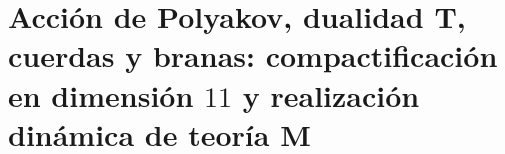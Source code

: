 \chapter{Acción de Polyakov, dualidad T, cuerdas y branas: compactificación en dimensión \texorpdfstring{\(11\)}{11} y realización dinámica de teoría M}
\label{chap:md-teoria-m-definitiva}
\begingroup
\let\HMTOwnerSection\section
\let\HMTOwnerSubsection\subsection
\let\HMTOwnerSubsubsection\subsubsection
\let\HMTOwnerParagraph\paragraph
\let\chapter\HMTOwnerSection
\let\section\HMTOwnerSubsection
\let\subsection\HMTOwnerSubsubsection
\let\subsubsection\HMTOwnerParagraph

\endgroup
\begingroup
\let\HMTOwnerSection\section
\let\HMTOwnerSubsection\subsection
\let\HMTOwnerSubsubsection\subsubsection

